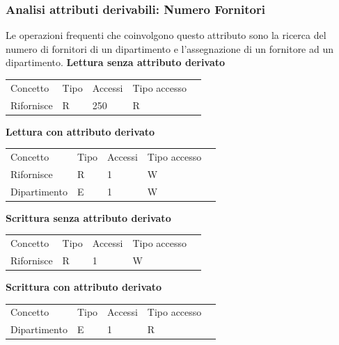 \documentclass{article}
\begin{document}
\subsubsection{Analisi attributi derivabili: Numero Fornitori}
Le operazioni frequenti che coinvolgono questo attributo sono la ricerca del numero di fornitori di un dipartimento e l'assegnazione di un fornitore ad un dipartimento.
\newline
\newline
\textbf{Lettura senza attributo derivato}
\begin{table}[H]
\renewcommand{\arraystretch}{1.2}
\centering
\begin{tabular}{|p{}|l|l|l|l|}
\cline{1-4}
Concetto & Tipo & Accessi & Tipo accesso\\ \cline{1-4}
Rifornisce & R & 250 & R \\ \cline{1-4}
\end{tabular}
\end{table}
\noindent
\textbf{Lettura con attributo derivato}
\begin{table}[H]
\renewcommand{\arraystretch}{1.2}
\centering
\begin{tabular}{|p{}|l|l|l|l|}
\cline{1-4}
Concetto & Tipo & Accessi & Tipo accesso\\ \cline{1-4}
Rifornisce & R & 1 & W \\ \cline{1-4}
Dipartimento & E & 1 & W \\ \cline{1-4}
\end{tabular}
\end{table}
\noindent
\textbf{Scrittura senza attributo derivato}
\begin{table}[H]
\renewcommand{\arraystretch}{1.2}
\centering
\begin{tabular}{|p{}|l|l|l|l|}
\cline{1-4}
Concetto & Tipo & Accessi & Tipo accesso\\ \cline{1-4}
Rifornisce & R & 1 & W \\ \cline{1-4}
\end{tabular}
\end{table}
\noindent
\textbf{Scrittura con attributo derivato}
\begin{table}[H]
\renewcommand{\arraystretch}{1.2}
\centering
\begin{tabular}{|p{}|l|l|l|l|}
\cline{1-4}
Concetto & Tipo & Accessi & Tipo accesso\\ \cline{1-4}
Dipartimento & E & 1 & R \\ \cline{1-4}
\end{tabular}
\end{table}
\end{document}
